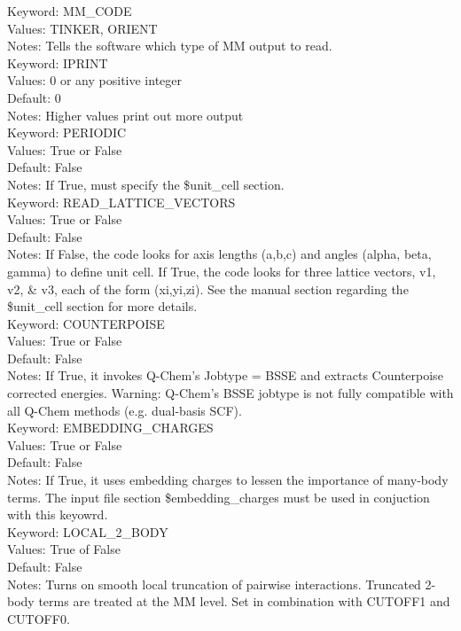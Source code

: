 \documentclass[11pt,letterpaper]{article}
\begin{document}
\begin{spacing}{1.0}
\noindent
Keyword: MM\_CODE \\
Values:  TINKER, ORIENT \\
Notes:   Tells the software which type of MM output to read. \\

\noindent
Keyword: IPRINT \\
Values:  0 or any positive integer \\
Default: 0 \\
Notes:   Higher values print out more output \\

\noindent
Keyword: PERIODIC \\
Values:  True or False  \\
Default: False \\
Notes:   If True, must specify the \$unit\_cell section. \\

\noindent
Keyword: READ\_LATTICE\_VECTORS \\
Values:  True or False \\
Default: False \\
Notes:   If False, the code looks for axis lengths (a,b,c) and angles
         (alpha, beta, gamma) to define unit cell.  If True, the code
         looks for three lattice vectors, v1, v2, \& v3, each of the form
         (xi,yi,zi).  See the manual section regarding the \$unit\_cell
	 section for more details. \\

\noindent
Keyword: COUNTERPOISE \\
Values:  True or False  \\
Default: False \\
Notes:   If True, it invokes Q-Chem's Jobtype = BSSE and extracts Counterpoise
	 corrected energies.  Warning: Q-Chem's BSSE jobtype is not fully
	 compatible with all Q-Chem methods (e.g. dual-basis SCF). \\

\noindent
Keyword: EMBEDDING\_CHARGES \\
Values:  True or False  \\
Default: False \\
Notes:   If True, it uses embedding charges to lessen the importance of 
many-body
	 terms.  The input file section \$embedding\_charges must be used in 
	 conjuction with this keyowrd. \\

\noindent
Keyword: LOCAL\_2\_BODY \\
Values:  True of False \\
Default: False \\
Notes:   Turns on smooth local truncation of pairwise interactions.  Truncated
	 2-body terms are treated at the MM level.  Set in combination with
         CUTOFF1 and CUTOFF0. \\


\end{spacing}
\end{document}
